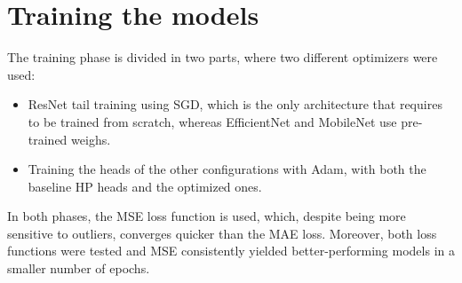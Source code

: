 
\section{Training the models} %
The training phase is divided in two parts, where two different optimizers were used: 
\begin{itemize}
    \item ResNet tail training using SGD, which is the only architecture that requires to be trained from scratch, whereas EfficientNet and MobileNet use pre-trained weighs.
    \item Training the heads of the other configurations with Adam, with both the baseline HP heads and the optimized ones. 
\end{itemize}


\noindent
In both phases, the MSE loss function is used, which, despite being more sensitive to outliers, converges quicker than the MAE loss. Moreover, both loss functions were tested and MSE consistently yielded better-performing models in a smaller number of epochs.\\

